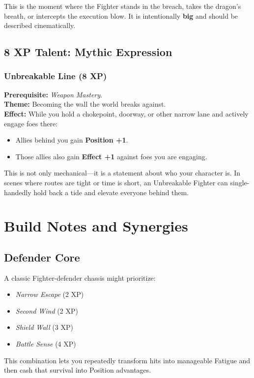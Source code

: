 \documentclass[11pt]{book}
\begin{document}
This is the moment where the Fighter stands in the breach,
takes the dragon's breath, or intercepts the execution blow.
It is intentionally \textbf{big} and should be described cinematically.

\subsection{8 XP Talent: Mythic Expression}

\subsubsection{Unbreakable Line (8 XP)}
\textbf{Prerequisite:} \emph{Weapon Mastery}.\\
\textbf{Theme:} Becoming the wall the world breaks against.\\
\textbf{Effect:} While you hold a chokepoint, doorway, or other narrow lane and
actively engage foes there:
\begin{itemize}
  \item Allies behind you gain \textbf{Position +1}.
  \item Those allies also gain \textbf{Effect +1} against foes you are engaging.
\end{itemize}

This is not only mechanical---it is a statement about who your character is.
In scenes where routes are tight or time is short, an Unbreakable Fighter can
single-handedly hold back a tide and elevate everyone behind them.

\section{Build Notes and Synergies}

\subsection{Defender Core}

A classic Fighter-defender chassis might prioritize:
\begin{itemize}
  \item \emph{Narrow Escape} (2 XP)
  \item \emph{Second Wind} (2 XP)
  \item \emph{Shield Wall} (3 XP)
  \item \emph{Battle Sense} (4 XP)
\end{itemize}

This combination lets you repeatedly transform hits into manageable Fatigue
and then cash that survival into Position advantages.
\end{document}
